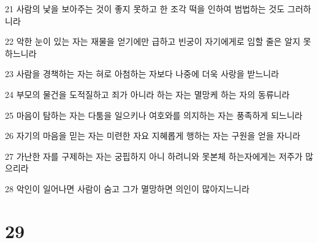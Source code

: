 \par 21 사람의 낯을 보아주는 것이 좋지 못하고 한 조각 떡을 인하여 범법하는 것도 그러하니라
\par 22 악한 눈이 있는 자는 재물을 얻기에만 급하고 빈궁이 자기에게로 임할 줄은 알지 못하느니라
\par 23 사람을 경책하는 자는 혀로 아첨하는 자보다 나중에 더욱 사랑을 받느니라
\par 24 부모의 물건을 도적질하고 죄가 아니라 하는 자는 멸망케 하는 자의 동류니라
\par 25 마음이 탐하는 자는 다툼을 일으키나 여호와를 의지하는 자는 풍족하게 되느니라
\par 26 자기의 마음을 믿는 자는 미련한 자요 지혜롭게 행하는 자는 구원을 얻을 자니라
\par 27 가난한 자를 구제하는 자는 궁핍하지 아니 하려니와 못본체 하는자에게는 저주가 많으리라
\par 28 악인이 일어나면 사람이 숨고 그가 멸망하면 의인이 많아지느니라

\chapter{29}

